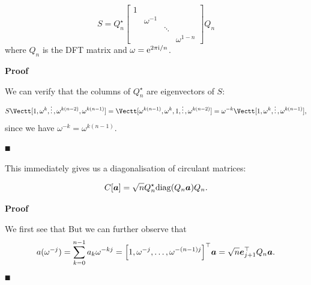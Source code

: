 \begin{proposition}[diagonalising $S$]
\[
S  = Q_n^\ensuremath{\star} \begin{bmatrix}1 \\ & \ensuremath{\omega}^{-1}
\\&& \ensuremath{\ddots}\\
 &&& \ensuremath{\omega}^{1-n} \end{bmatrix} Q_n
\]
where $Q_n$ is the DFT matrix and $\omega = {\rm e}^{2\pi{\rm i}/n}$.

\end{proposition}
\textbf{Proof}

We can verify that the columns of $Q_n^\ensuremath{\star}$ are eigenvectors of $S$:
\[
S \Vectt[1, \ensuremath{\omega}^k , \dots, \ensuremath{\omega}^{k(n-2)}, \ensuremath{\omega}^{k(n-1)}] = \Vectt[\ensuremath{\omega}^{k(n-1)},\ensuremath{\omega}^k ,  1, \dots, \ensuremath{\omega}^{k(n-2)}] = 
\ensuremath{\omega}^{-k} \Vectt[1, \ensuremath{\omega}^k , \dots, \ensuremath{\omega}^{k(n-1)}],
\]
since we have $\ensuremath{\omega}^{-k} =  \ensuremath{\omega}^{k(n-1)}$. 

\ensuremath{\QED}

This immediately gives us a diagonalisation of circulant matrices:

\begin{theorem}
\[
C[\bm{{\mbox{\boldmath$a$\unboldmath}}}]  = \sqrt{n} Q_n^\star {\rm diag}(Q_n \bm{{\mbox{\boldmath$a$\unboldmath}}}) Q_n.
\]
\end{theorem}
\textbf{Proof}

We first see that
But we can further observe that
\[
a(\ensuremath{\omega}^{-j}) = \ensuremath{\sum}_{k=0}^{n-1} a_k \ensuremath{\omega}^{-kj} = \vectt[1,\ensuremath{\omega}^{-j},\ensuremath{\ldots},\ensuremath{\omega}^{-(n-1)j}] \ensuremath{\bm{\a}} = 
\sqrt{n}\ensuremath{\bm{\e}}_{j+1}^\ensuremath{\top} Q_n \ensuremath{\bm{\a}}.
\]
\ensuremath{\QED}

